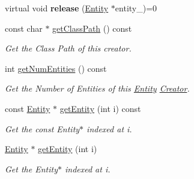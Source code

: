 \begin{DoxyCompactItemize}
\item 
virtual void {\bfseries release} (\hyperlink{class_i_dream_sky_1_1_entity}{Entity} $\ast$entity\+\_\+)=0\hypertarget{class_i_dream_sky_1_1_entity_1_1_i_creator_a1efc30f1edd6a93a7800706f1ad1d447}{}\label{class_i_dream_sky_1_1_entity_1_1_i_creator_a1efc30f1edd6a93a7800706f1ad1d447}

\item 
const char $\ast$ \hyperlink{class_i_dream_sky_1_1_entity_1_1_i_creator_ad9a8b6d71f7c3ff236db456d8cfb7c7e}{get\+Class\+Path} () const 
\begin{DoxyCompactList}\small\item\em Get the Class Path of this creator. \end{DoxyCompactList}\item 
int \hyperlink{class_i_dream_sky_1_1_entity_1_1_i_creator_a57d32707da8ab3832d3b092b6e6fc85a}{get\+Num\+Entities} () const 
\begin{DoxyCompactList}\small\item\em Get the Number of Entities of this \hyperlink{class_i_dream_sky_1_1_entity}{Entity} \hyperlink{class_i_dream_sky_1_1_entity_1_1_creator}{Creator}. \end{DoxyCompactList}\item 
const \hyperlink{class_i_dream_sky_1_1_entity}{Entity} $\ast$ \hyperlink{class_i_dream_sky_1_1_entity_1_1_i_creator_a845f6633bcce0df7961820300315cc91}{get\+Entity} (int i) const 
\begin{DoxyCompactList}\small\item\em Get the const Entity$\ast$ indexed at i. \end{DoxyCompactList}\item 
\hyperlink{class_i_dream_sky_1_1_entity}{Entity} $\ast$ \hyperlink{class_i_dream_sky_1_1_entity_1_1_i_creator_ae3f55786e3ea5e8594dc9710af13d9f7}{get\+Entity} (int i)
\begin{DoxyCompactList}\small\item\em Get the Entity$\ast$ indexed at i. \end{DoxyCompactList}\end{DoxyCompactItemize}
